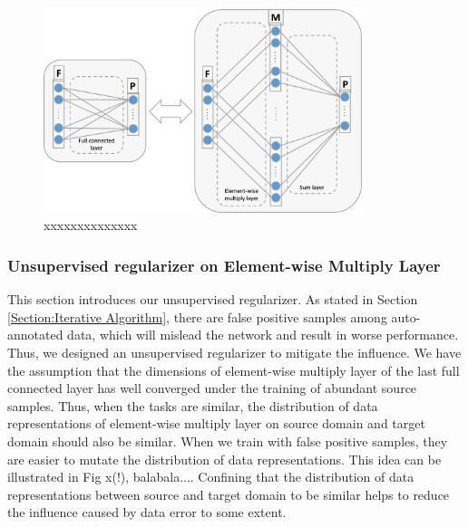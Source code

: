\documentclass[runningheads]{llncs}
\begin{document}
\begin{figure}
\centering
\includegraphics[height=6cm]{images/elementwiselayer.png}
\caption{xxxxxxxxxxxxxx}
\label{fig:elementwiselayer}
\end{figure}

\subsubsection{Unsupervised regularizer on Element-wise Multiply Layer}

This section introduces our unsupervised regularizer. As stated in Section \ref{Section:Iterative Algorithm}, there are false positive samples among auto-annotated data, which will mislead the network and result in worse performance. Thus, we designed an unsupervised regularizer to mitigate the influence. We have the assumption that the dimensions of element-wise multiply layer of the last full connected layer has well converged under the training of abundant source samples. Thus, when the tasks are similar, the distribution of data representations of element-wise multiply layer on source domain and target domain should also be similar. When we train with false positive samples, they are easier to mutate the distribution of data representations. This idea can be illustrated in Fig x(!), balabala.... Confining that the distribution of data representations between source and target domain to be similar helps to reduce the influence caused by data error to some extent. 
\end{document}
